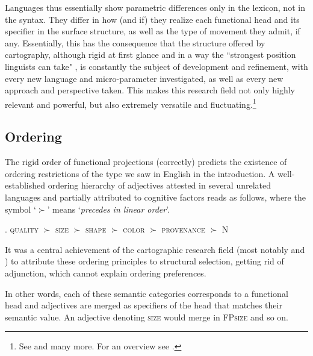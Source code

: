 \documentclass [output=book,colorlinks,citecolor=brown]{langscibook}
\begin{document}
Languages thus essentially show parametric differences only in the lexicon, not in the syntax. They differ in how (and if) they realize each functional head and its specifier in the surface structure, as well as the type of movement they admit, if any. Essentially, this has the consequence that the structure offered by cartography, although rigid at first glance and in a way the ``strongest position linguists can take" \citep[9]{bortolotto:2016:RA}, is constantly the subject of development and refinement, with every new language and micro-parameter investigated, as well as every new approach and perspective taken. This makes this research field not only highly relevant and powerful, but also extremely versatile and fluctuating.\footnote{See \citet{cinque:1993:evidence, cinque:1999:adverbs, cinque:2010:adj, cinque:2020:relcl, rizzi:1997:the, rizzi:2004:the, shlonsky:2004:form, poletto:2000:the, scott:2002:stacked, laenzlinger:2011:elements} and many more. For an overview see \citet{cinriz:2010:carto, cinriz:2016:functional}.}

\subsection{Ordering}

The rigid order of functional projections (correctly) predicts the existence of ordering restrictions of the type we saw in English in the introduction. A well-established ordering hierarchy of adjectives attested in several unrelated languages \citep{sussex:1974:the, dixon:1982:where, hetzron:1978:on} and partially attributed to cognitive factors \citep{sproat:1987:pre, sproat:1991:the} reads as follows, where the symbol `$\succ$’ means `\textit{precedes in linear order}’. %

\ex. \textsc{quality} $\succ$ \textsc{size} $\succ$ \textsc{shape} $\succ$ \textsc{color} $\succ$ \textsc{provenance} $\succ$ N \\ \null \hfill \citep{sproat:1991:the}

It was a central achievement of the cartographic research field (most notably \citealt{cinque:1993:evidence, scott:2002:stacked, laenzlinger:2005:french, panayidou:2013:in} and \citealt{cinque:2010:adj}) to attribute these ordering principles to structural selection, getting rid of adjunction, which cannot explain ordering preferences.

In other words, each of these semantic categories corresponds to a functional head and adjectives are merged as specifiers of the head that matches their semantic value. An adjective denoting \textsc{size} would merge in FP\textsc{size} and so on.
\end{document}
